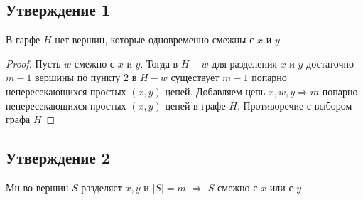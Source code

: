 \documentclass[12pt]{article}
\begin{document}
\subsection{Утверждение 1}
	В гарфе $H$ нет вершин, которые одновременно смежны с $x$ и $y$
	\begin{proof}
		Пусть $w$ смежно с $x$ и $y$. Тогда в $H-w$ для разделения $x$ и $y$ достаточно $m-1$ вершины по пункту 2 в $H-w$ существует $m-1$ попарно непересекающихся
		простых $(x,y)$-цепей. Добавляем цепь $x,w,y \Rightarrow m$ попарно непересекающихся простых $(x,y)$ цепей в графе $H$. Противоречие с выбором графа $H$
	\end{proof}
	
\subsection{Утверждение 2}
	Мн-во вершин $S$ разделяет $x,y$ и $|S| = m$ $\Rightarrow$ $S$ смежно с $x$ или с $y$
\end{document}
